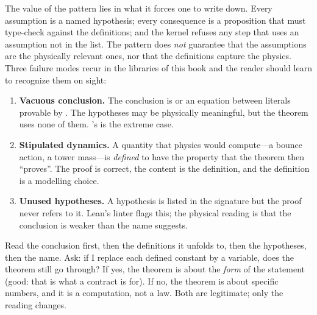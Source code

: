The value of the pattern lies in what it forces one to write down. Every assumption is a named
hypothesis; every consequence is a proposition that must type-check against the definitions;
and the kernel refuses any step that uses an assumption not in the list. The pattern does
\emph{not} guarantee that the assumptions are the physically relevant ones, nor that the
definitions capture the physics. Three failure modes recur in the libraries of this book and
the reader should learn to recognize them on sight:

\begin{enumerate}[leftmargin=2em,itemsep=2pt]
\item \textbf{Vacuous conclusion.} The conclusion is  or an equation between literals
provable by . The hypotheses may be physically meaningful, but the theorem uses none of
them. 's  is the extreme case.
\item \textbf{Stipulated dynamics.} A quantity that physics would compute---a bounce action, a
tower mass---is \emph{defined} to have the property that the theorem then ``proves''. The proof
is correct, the content is the definition, and the definition is a modelling choice.
\item \textbf{Unused hypotheses.} A hypothesis is listed in the signature but the proof never
refers to it. Lean's linter flags this; the physical reading is that the conclusion is weaker
than the name suggests.
\end{enumerate}

\begin{physicsbox}
Read the conclusion first, then the definitions it unfolds to, then the hypotheses, then the
name. Ask: if I replace each defined constant by a variable, does the theorem still go through?
If yes, the theorem is about the \emph{form} of the statement (good: that is what a contract is
for). If no, the theorem is about specific numbers, and it is a computation, not a law. Both are
legitimate; only the reading changes.
\end{physicsbox}


